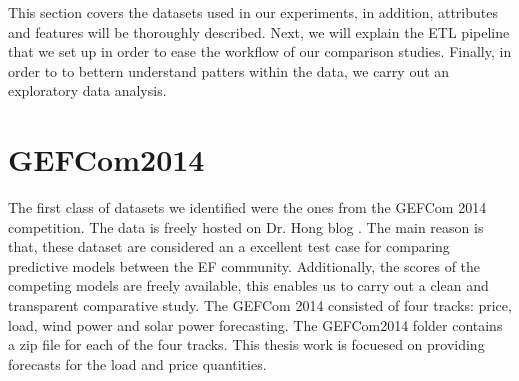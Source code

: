 






This section covers the datasets used in our experiments, in addition, attributes and features will be thoroughly described.
Next, we will explain the ETL pipeline that we set up in order to ease the workflow of our comparison studies.
Finally, in order to to bettern understand patters within the data, we carry out an exploratory data analysis.

\section{GEFCom2014}
The first class of datasets we identified were the ones from the GEFCom 2014 competition. The data is freely hosted on Dr. Hong blog \cite{hong2016probabilistic}.
The main reason is that, these dataset are considered an a excellent test case for comparing predictive models between the EF community. Additionally, the scores of the competing models are freely available, this enables us to carry out a clean and transparent comparative study.
The GEFCom 2014 consisted of four tracks: price, load, wind power and solar power forecasting. 
The GEFCom2014 folder contains a zip file for each of the four tracks.
This thesis work is focuesed on providing forecasts for the load and price quantities.
\\

